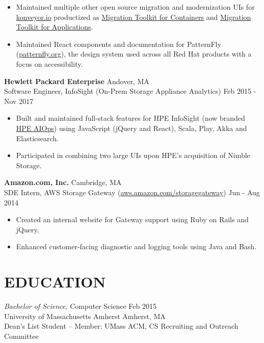 \documentclass[line,margin]{res}
\begin{document}
\begin{resume}
\begin{itemize}
        \item Maintained multiple other open source migration and modernization UIs for \href{https://konveyor.io/}{konveyor.io} productized as \href{https://catalog.redhat.com/en/software/container-stacks/detail/5ec53fffef29fd35586d9a5a}{Migration Toolkit for Containers} and \href{https://developers.redhat.com/products/mta}{Migration Toolkit for Applications}.
        \item Maintained React components and documentation for PatternFly (\href{https://www.patternfly.org/}{patternfly.org}), the design system used across all Red Hat products with a focus on accessibility.
    \end{itemize}

    {\large \textbf{Hewlett Packard Enterprise}}
    \hfill Andover, MA \\
    Software Engineer, InfoSight (On-Prem Storage Appliance Analytics)
    \hfill Feb 2015 - Nov 2017
    \begin{itemize}  \itemsep -2pt %
        \item Built and maintained full-stack features for HPE InfoSight (now branded \href{https://www.hpe.com/us/en/storage/aiops.html}{HPE AIOps}) using JavaScript (jQuery and React), Scala, Play, Akka and Elasticsearch.
        \item Participated in combining two large UIs upon HPE's acquisition of Nimble Storage.
    \end{itemize}

    {\large \textbf{Amazon.com, Inc.}}
    \hfill Cambridge, MA \\
    SDE Intern, AWS Storage Gateway (\href{https://aws.amazon.com/storagegateway/}{aws.amazon.com/storagegateway})
    \hfill Jun - Aug 2014
    \begin{itemize}  \itemsep -2pt
        \item Created an internal website for Gateway support using Ruby on Rails and jQuery.
        \item Enhanced customer-facing diagnostic and logging tools using Java and Bash.
    \end{itemize}

\section{EDUCATION}
    {\sl Bachelor of Science,} Computer Science \hfill Feb 2015 \\
    University of Massachusetts Amherst \hfill Amherst, MA \\
    Dean's List Student -- Member: UMass ACM, CS Recruiting and Outreach Committee


\end{resume}
\end{document}
